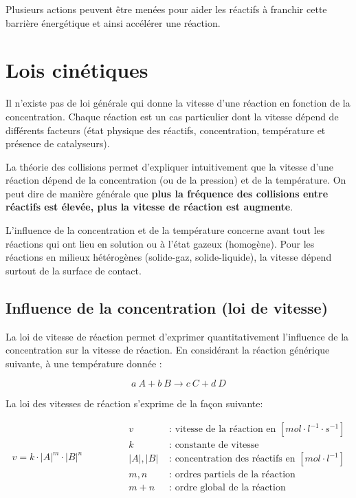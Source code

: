 \documentclass[
  11pt,
  a4paper,
  openany]{book}
\begin{document}
Plusieurs actions peuvent être menées pour aider les réactifs à franchir cette barrière énergétique et ainsi accélérer une réaction.

\hypertarget{lois-cinuxe9tiques}{%
\section{Lois cinétiques}\label{lois-cinuxe9tiques}}

Il n'existe pas de loi générale qui donne la vitesse d'une réaction en fonction de la concentration. Chaque réaction est un cas particulier dont la vitesse dépend de différents facteurs (état physique des réactifs, concentration, température et présence de catalyseurs).

La théorie des collisions permet d'expliquer intuitivement que la vitesse d'une réaction dépend de la concentration (ou de la pression) et de la température. On peut dire de manière générale que \textbf{plus la fréquence des collisions entre réactifs est élevée, plus la vitesse de réaction est augmente}.

L'influence de la concentration et de la température concerne avant tout les réactions qui ont lieu en solution ou à l'état gazeux (homogène). Pour les réactions en milieux hétérogènes (solide-gaz, solide-liquide), la vitesse dépend surtout de la surface de contact.

\hypertarget{influence-de-la-concentration-loi-de-vitesse}{%
\subsection{Influence de la concentration (loi de vitesse)}\label{influence-de-la-concentration-loi-de-vitesse}}

La loi de vitesse de réaction permet d'exprimer quantitativement l'influence de la concentration sur la vitesse de réaction. En considérant la réaction générique suivante, à une température donnée :

\[
a\ A + b\ B \rightarrow c\ C + d\ D
\]

La loi des vitesses de réaction s'exprime de la façon suivante:

\[
\begin{split}
v = k \cdot |A|^m \cdot |B|^n
\end{split}
\qquad\qquad
\begin{split}
v &\text{ : vitesse de la réaction en } [mol \cdot l^{-1} \cdot s^{-1}] \\
k &\text{ : constante de vitesse} \\
|A|, |B| &\text{ : concentration des réactifs en } [mol \cdot l^{-1}] \\
m, n &\text{ : ordres partiels de la réaction} \\
m+n &\text{ : ordre global de la réaction}
\end{split}
\]
\end{document}
